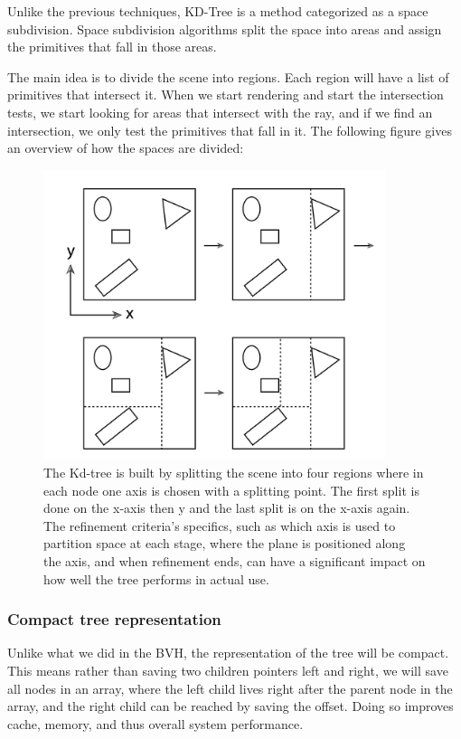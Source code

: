 \documentclass[11pt,a4paper]{article}
\begin{document}
Unlike the previous techniques, KD-Tree is a method categorized as a space subdivision.
Space subdivision algorithms split the space into areas and assign the primitives that fall in those areas.
\\
\noindent

The main idea is to divide the scene into regions. Each region will have a list of primitives that intersect it. When we start rendering and start the intersection tests, we start looking for areas that intersect with the ray, and if we find an intersection, we only test the primitives that fall in it.
The following figure gives an overview of how the spaces are divided: 

\begin{figure}[h]	
     \centering
     \captionsetup{justification=centering,margin=2cm}
     \includegraphics[width=10cm]{images/kdtree/example_demo.png}
     \caption{The Kd-tree is built by splitting the scene into four regions where in each node one axis is chosen with a splitting point.  The first split is done on the x-axis then y and the last split is on the x-axis again. The refinement criteria's specifics, such as which axis is used to partition space at each stage, where the plane is positioned along the axis, and when refinement ends, can have a significant impact on how well the tree performs in actual use. \protect\cite{Pharr2016}}
        \label{fig:dice}
\end{figure}



\subsubsection{Compact tree representation}
Unlike what we did in the BVH, the representation of the tree will be compact. This means rather than saving two children pointers left and right, we will save all nodes in an array, where the left child lives right after the parent node in the array, and the right child can be reached by saving the offset. Doing so improves cache, memory, and thus overall system performance.
\end{document}
